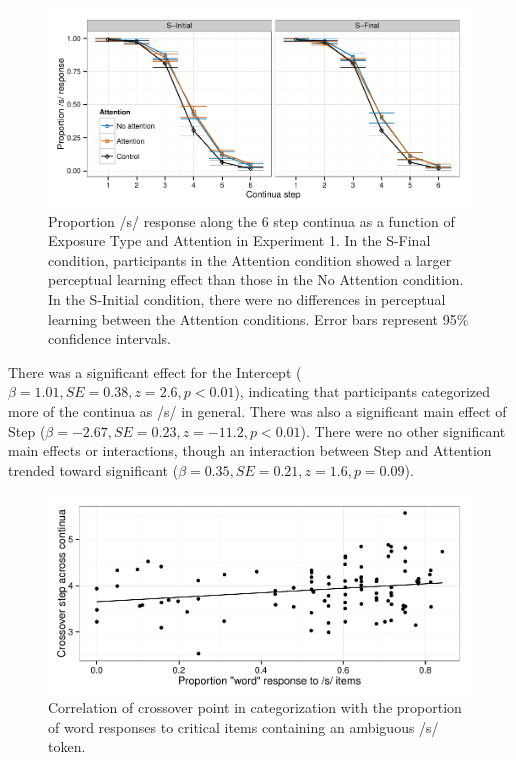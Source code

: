 \begin{figure}[!ht]
\caption{Proportion /s/ response along the 6 step continua as a function of Exposure Type and Attention in Experiment 1.    In the S-Final condition, participants in the Attention condition showed a larger perceptual learning effect than those in the No Attention condition.  In the S-Initial condition, there were no differences in perceptual learning between the Attention conditions. Error bars represent 95\% confidence intervals.}
\label{fig:exp2categ}
\begin{center}
\includegraphics[width=\textwidth]{graphs/exp2_categresults}
\end{center}
\end{figure}

There was a significant effect for the Intercept ($\beta = 1.01, SE = 0.38, z = 2.6, p < 0.01$), indicating that participants categorized more of the continua as /s/ in general.  There was also a significant main effect of Step ($\beta = -2.67, SE = 0.23, z = -11.2, p < 0.01$).  There were no other significant main effects or interactions, though an interaction between Step and Attention trended toward significant ($\beta = 0.35, SE = 0.21, z = 1.6, p = 0.09$).

\begin{figure}[!ht]

\caption{Correlation of crossover point in categorization with the proportion of word responses to critical items containing an ambiguous /s/ token.}\label{fig:exp2xover}
\begin{center}
\includegraphics[width=\textwidth]{graphs/exp2_xoverwordresp}
\end{center}
\end{figure}

